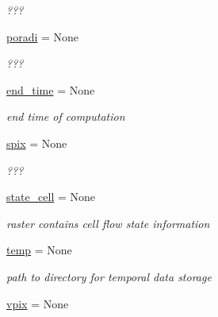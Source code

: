 \begin{DoxyCompactItemize}
\begin{DoxyCompactList}\small\item\em ??? \end{DoxyCompactList}\item 
\hypertarget{namespacesmoderp2d_1_1glob_a9c20bdb8c1604c55732f5734a8aa7b01}{\hyperlink{namespacesmoderp2d_1_1glob_a9c20bdb8c1604c55732f5734a8aa7b01}{poradi} = None}\label{namespacesmoderp2d_1_1glob_a9c20bdb8c1604c55732f5734a8aa7b01}

\begin{DoxyCompactList}\small\item\em ??? \end{DoxyCompactList}\item 
\hypertarget{namespacesmoderp2d_1_1glob_a367fc18bf663a2d42e8fe0572ff68ede}{\hyperlink{namespacesmoderp2d_1_1glob_a367fc18bf663a2d42e8fe0572ff68ede}{end\-\_\-time} = None}\label{namespacesmoderp2d_1_1glob_a367fc18bf663a2d42e8fe0572ff68ede}

\begin{DoxyCompactList}\small\item\em end time of computation \end{DoxyCompactList}\item 
\hypertarget{namespacesmoderp2d_1_1glob_a4a98e53220cbefe073ade766886f8b2b}{\hyperlink{namespacesmoderp2d_1_1glob_a4a98e53220cbefe073ade766886f8b2b}{spix} = None}\label{namespacesmoderp2d_1_1glob_a4a98e53220cbefe073ade766886f8b2b}

\begin{DoxyCompactList}\small\item\em ??? \end{DoxyCompactList}\item 
\hypertarget{namespacesmoderp2d_1_1glob_ac7e89b489549da498b448ca415aa90c8}{\hyperlink{namespacesmoderp2d_1_1glob_ac7e89b489549da498b448ca415aa90c8}{state\-\_\-cell} = None}\label{namespacesmoderp2d_1_1glob_ac7e89b489549da498b448ca415aa90c8}

\begin{DoxyCompactList}\small\item\em raster contains cell flow state information \end{DoxyCompactList}\item 
\hypertarget{namespacesmoderp2d_1_1glob_a5305d44839d537ca3402a7522572c202}{\hyperlink{namespacesmoderp2d_1_1glob_a5305d44839d537ca3402a7522572c202}{temp} = None}\label{namespacesmoderp2d_1_1glob_a5305d44839d537ca3402a7522572c202}

\begin{DoxyCompactList}\small\item\em path to directory for temporal data storage \end{DoxyCompactList}\item 
\hypertarget{namespacesmoderp2d_1_1glob_a2b1679e9502ce04424a4422268c4ddf5}{\hyperlink{namespacesmoderp2d_1_1glob_a2b1679e9502ce04424a4422268c4ddf5}{vpix} = None}\label{namespacesmoderp2d_1_1glob_a2b1679e9502ce04424a4422268c4ddf5}


\end{DoxyCompactItemize}
